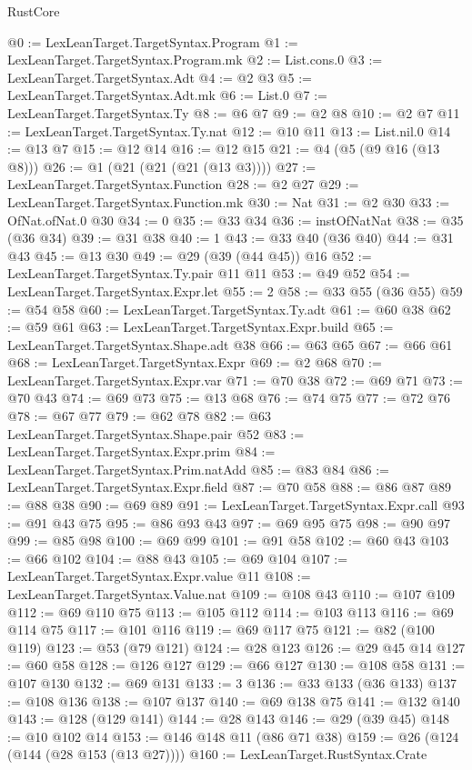 \begin{lexlean}{RustCore}
\begin{coremodule}
{\begin{coremodule}
{{{{{{{@0 := LexLeanTarget.TargetSyntax.Program
@1 := LexLeanTarget.TargetSyntax.Program.mk
@2 := List.cons.{0}
@3 := LexLeanTarget.TargetSyntax.Adt
@4 := @2 @3
@5 := LexLeanTarget.TargetSyntax.Adt.mk
@6 := List.{0}
@7 := LexLeanTarget.TargetSyntax.Ty
@8 := @6 @7
@9 := @2 @8
@10 := @2 @7
@11 := LexLeanTarget.TargetSyntax.Ty.nat
@12 := @10 @11
@13 := List.nil.{0}
@14 := @13 @7
@15 := @12 @14
@16 := @12 @15
@21 := @4 (@5 (@9 @16 (@13 @8)))
@26 := @1 (@21 (@21 (@21 (@13 @3))))
@27 := LexLeanTarget.TargetSyntax.Function
@28 := @2 @27
@29 := LexLeanTarget.TargetSyntax.Function.mk
@30 := Nat
@31 := @2 @30
@33 := OfNat.ofNat.{0} @30
@34 := 0
@35 := @33 @34
@36 := instOfNatNat
@38 := @35 (@36 @34)
@39 := @31 @38
@40 := 1
@43 := @33 @40 (@36 @40)
@44 := @31 @43
@45 := @13 @30
@49 := @29 (@39 (@44 @45)) @16
@52 := LexLeanTarget.TargetSyntax.Ty.pair @11 @11
@53 := @49 @52
@54 := LexLeanTarget.TargetSyntax.Expr.let
@55 := 2
@58 := @33 @55 (@36 @55)
@59 := @54 @58
@60 := LexLeanTarget.TargetSyntax.Ty.adt
@61 := @60 @38
@62 := @59 @61
@63 := LexLeanTarget.TargetSyntax.Expr.build
@65 := LexLeanTarget.TargetSyntax.Shape.adt @38
@66 := @63 @65
@67 := @66 @61
@68 := LexLeanTarget.TargetSyntax.Expr
@69 := @2 @68
@70 := LexLeanTarget.TargetSyntax.Expr.var
@71 := @70 @38
@72 := @69 @71
@73 := @70 @43
@74 := @69 @73
@75 := @13 @68
@76 := @74 @75
@77 := @72 @76
@78 := @67 @77
@79 := @62 @78
@82 := @63 LexLeanTarget.TargetSyntax.Shape.pair @52
@83 := LexLeanTarget.TargetSyntax.Expr.prim
@84 := LexLeanTarget.TargetSyntax.Prim.natAdd
@85 := @83 @84
@86 := LexLeanTarget.TargetSyntax.Expr.field
@87 := @70 @58
@88 := @86 @87
@89 := @88 @38
@90 := @69 @89
@91 := LexLeanTarget.TargetSyntax.Expr.call
@93 := @91 @43 @75
@95 := @86 @93 @43
@97 := @69 @95 @75
@98 := @90 @97
@99 := @85 @98
@100 := @69 @99
@101 := @91 @58
@102 := @60 @43
@103 := @66 @102
@104 := @88 @43
@105 := @69 @104
@107 := LexLeanTarget.TargetSyntax.Expr.value @11
@108 := LexLeanTarget.TargetSyntax.Value.nat
@109 := @108 @43
@110 := @107 @109
@112 := @69 @110 @75
@113 := @105 @112
@114 := @103 @113
@116 := @69 @114 @75
@117 := @101 @116
@119 := @69 @117 @75
@121 := @82 (@100 @119)
@123 := @53 (@79 @121)
@124 := @28 @123
@126 := @29 @45 @14
@127 := @60 @58
@128 := @126 @127
@129 := @66 @127
@130 := @108 @58
@131 := @107 @130
@132 := @69 @131
@133 := 3
@136 := @33 @133 (@36 @133)
@137 := @108 @136
@138 := @107 @137
@140 := @69 @138 @75
@141 := @132 @140
@143 := @128 (@129 @141)
@144 := @28 @143
@146 := @29 (@39 @45)
@148 := @10 @102 @14
@153 := @146 @148 @11 (@86 @71 @38)
@159 := @26 (@124 (@144 (@28 @153 (@13 @27))))
@160 := LexLeanTarget.RustSyntax.Crate
}}}}}}}
\end{coremodule}}
\end{coremodule}
\end{lexlean}
